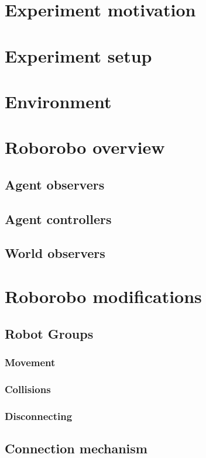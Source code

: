 

\section{Experiment motivation}
\section{Experiment setup}
\section{Environment}

\section{Roborobo overview}
	\subsection{Agent observers}
	\subsection{Agent controllers}
	\subsection{World observers}

\section{Roborobo modifications}
	\subsection{Robot Groups}
	\subsubsection{Movement}
	\subsubsection{Collisions}
	\subsubsection{Disconnecting}

	\subsection{Connection mechanism}
